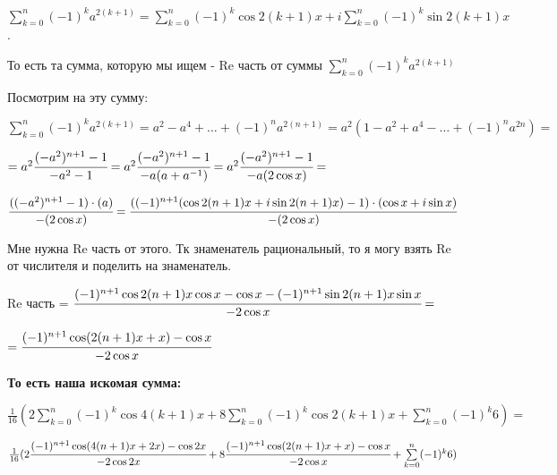 \documentclass{article}
\begin{document}
$\sum\limits_{k=0}^n (-1)^k a^{2(k+1)}=\sum\limits_{k=0}^n (-1)^k\cos 2(k+1)x + i\sum\limits_{k=0}^n (-1)^k\sin 2(k+1)x$.

То есть та сумма, которую мы ищем - Re часть от суммы $\sum\limits_{k=0}^n (-1)^k a^{2(k+1)}$

Посмотрим на эту сумму:

$\sum\limits_{k=0}^n (-1)^k a^{2(k+1)} = a^2 - a^4 + \ldots + (-1)^n a^{2(n+1)} = a^2 (1-a^2+a^4-\ldots + (-1)^na^{2n}) = $

$=a^2 \cfrac{(-a^2)^{n+1}-1}{-a^2-1} =a^2 \cfrac{(-a^2)^{n+1}-1}{-a(a+a^{-1})} = a^2 \cfrac{(-a^2)^{n+1}-1}{-a(2 \cos x)} = $

$\cfrac{((-a^2)^{n+1}-1)\cdot(a)}{-(2 \cos x)} = 
\cfrac{((-1)^{n+1}(\cos 2(n+1)x+i\sin2(n+1)x)-1)\cdot(\cos x +i\sin x)}{-(2 \cos x)} $

Мне нужна Re часть от этого. Тк знаменатель рациональный, то  я могу взять Re от числителя и поделить на знаменатель.

Re часть = $ \cfrac{(-1)^{n+1} \cos 2(n+1)x \cos x - \cos x - (-1)^{n+1} \sin 2(n+1)x \sin x}{-2\cos x} = $

$  = \cfrac{(-1)^{n+1} \cos (2(n+1)x+x) - \cos x}{-2\cos x}$

\textbf{То есть наша искомая сумма: }

$\frac{1}{16} (2\sum\limits_{k=0}^n (-1)^k \cos 4(k+1)x + 8\sum\limits_{k=0}^n (-1)^k \cos 2(k+1)x + \sum\limits_{k=0}^n (-1)^k 6) = $

$\frac{1}{16}( 2\cfrac{(-1)^{n+1} \cos (4(n+1)x+2x) - \cos 2x}{-2\cos 2x} + 8  \cfrac{(-1)^{n+1} \cos (2(n+1)x+x) - \cos x}{-2\cos x} +\sum\limits_{k=0}^n (-1)^k 6 )$
\end{document}
